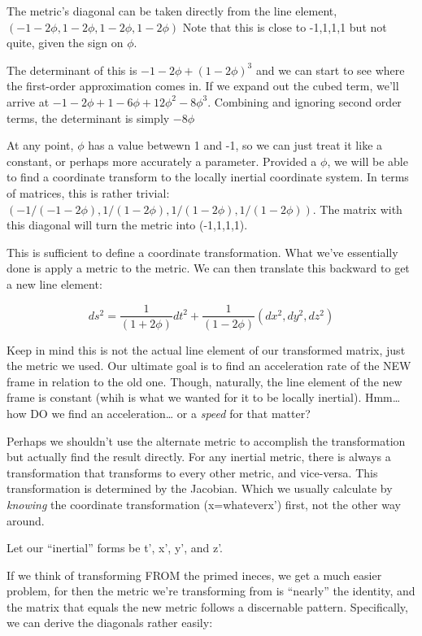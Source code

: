 \documentclass[landscape,letterpaper,10pt,english]{article}
\begin{document}
    The metric's diagonal can be taken directly from the line element,
\((-1-2\phi, 1-2\phi, 1-2\phi, 1-2\phi)\) Note that this is close to
-1,1,1,1 but not quite, given the sign on \(\phi.\)

The determinant of this is \(-1-2\phi+(1-2\phi)^3\) and we can start to
see where the first-order approximation comes in. If we expand out the
cubed term, we'll arrive at \(-1-2\phi+1-6\phi+12\phi^2-8\phi^3.\)
Combining and ignoring second order terms, the determinant is simply
\(-8\phi\)

At any point, \(\phi\) has a value betwewn 1 and -1, so we can just
treat it like a constant, or perhaps more accurately a parameter.
Provided a \(\phi\), we will be able to find a coordinate transform to
the locally inertial coordinate system. In terms of matrices, this is
rather trivial:
\((-1/(-1-2\phi), 1/(1-2\phi), 1/(1-2\phi), 1/(1-2\phi))\). The matrix
with this diagonal will turn the metric into (-1,1,1,1).

This is sufficient to define a coordinate transformation. What we've
essentially done is apply a metric to the metric. We can then translate
this backward to get a new line element:

\[ds^2 = \frac{1}{(1+2\phi)}dt^2 + \frac{1}{(1-2\phi)}(dx^2,dy^2,dz^2)\]

    Keep in mind this is not the actual line element of our transformed
matrix, just the metric we used. Our ultimate goal is to find an
acceleration rate of the NEW frame in relation to the old one. Though,
naturally, the line element of the new frame is constant (whih is what
we wanted for it to be locally inertial). Hmm\ldots{} how DO we find an
acceleration\ldots{} or a \emph{speed} for that matter?

    Perhaps we shouldn't use the alternate metric to accomplish the
transformation but actually find the result directly. For any inertial
metric, there is always a transformation that transforms to every other
metric, and vice-versa. This transformation is determined by the
Jacobian. Which we usually calculate by \emph{knowing} the coordinate
transformation (x=whateverx') first, not the other way around.

Let our ``inertial'' forms be t', x', y', and z'.

If we think of transforming FROM the primed ineces, we get a much easier
problem, for then the metric we're transforming from is ``nearly'' the
identity, and the matrix that equals the new metric follows a
discernable pattern. Specifically, we can derive the diagonals rather
easily:
\end{document}
